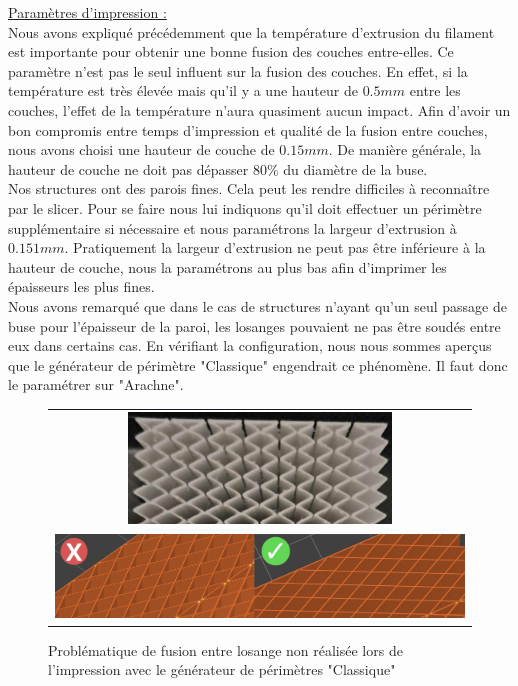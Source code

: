 \documentclass[a4paper]{article}
\begin{document}
	\underline{Paramètres d'impression :}\\
	
	\hspace{0.5cm}Nous avons expliqué précédemment que la température d'extrusion du filament est importante pour obtenir une bonne fusion des couches entre-elles. Ce paramètre n'est pas le seul influent sur la fusion des couches. En effet, si la température est très élevée mais qu'il y a une hauteur de $0.5 mm$ entre les couches, l'effet de la température n'aura quasiment aucun impact. Afin d'avoir un bon compromis entre temps d'impression et qualité de la fusion entre couches, nous avons choisi une hauteur de couche de $0.15 mm$. De manière générale, la hauteur de couche ne doit pas dépasser $80 \%$ du diamètre de la buse.\\
	
	Nos structures ont des parois fines. Cela peut les rendre difficiles à reconnaître par le slicer. Pour se faire nous lui indiquons qu'il doit effectuer un périmètre supplémentaire si nécessaire et nous paramétrons la largeur d'extrusion à $0.151 mm$. Pratiquement la largeur d'extrusion ne peut pas être inférieure à la hauteur de couche, nous la paramétrons au plus bas afin d'imprimer les épaisseurs les plus fines.\\
	
	Nous avons remarqué que dans le cas de structures n'ayant qu'un seul passage de buse pour l'épaisseur de la paroi, les losanges pouvaient ne pas être soudés entre eux dans certains cas. En vérifiant la configuration, nous nous sommes aperçus que le générateur de périmètre "Classique" engendrait ce phénomène. Il faut donc le paramétrer sur "Arachne".
	
	\label{jointure_losanges}
	\begin{figure}[H]
		\centering
		\begin{tabular}{c}
			\includegraphics[width=7cm]{Images/4/jointure_murs.jpg}\\
			\includegraphics[width=16cm]{Images/4/ok_nok_perimetres.png}\\
		\end{tabular}
		\caption{Problématique de fusion entre losange non réalisée lors de l'impression avec le générateur de périmètres "Classique"}
	\end{figure}
\end{document}
